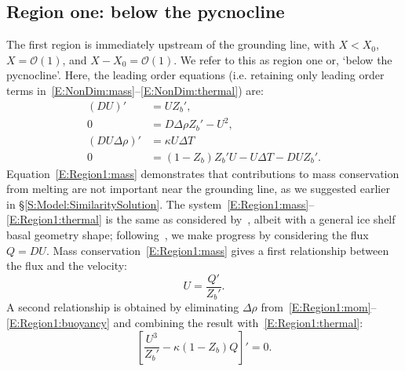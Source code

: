 \documentclass[openacc]{rsproca_new}%
\newcommand{\dd}[2]{\frac{\mathrm{d} #1}{\mathrm{d} #2}}
\newcommand{\order}[1]{\mathcal{O}(#1)}
\begin{document}
\subsection{Region one: below the pycnocline}\label{S:Asymptotics:Region1}
The first region is immediately upstream of the grounding line,  with $X  <  X_0$,  $X= \order{1}$, and $X - X_0 = \mathcal{O}(1)$. We refer to this as region one or, `below the pycnocline'. Here, the leading order equations (i.e. retaining only leading order terms in~\eqref{E:NonDim:mass}--\eqref{E:NonDim:thermal}) are:
\begin{align}
(DU)' &= U Z_b',\label{E:Region1:mass}\\
0 &= D \Delta \rho Z_b' - U^2, \label{E:Region1:mom}\\
(DU\Delta \rho)'  &=\kappa U \Delta T\label{E:Region1:buoyancy}\\
0&= (1  - Z_b)Z_b' U- U\Delta T - DU Z_b'.\label{E:Region1:thermal}
\end{align}
Equation~\eqref{E:Region1:mass} demonstrates that contributions to mass conservation from melting are not important near the grounding line, as we suggested earlier in \S\ref{S:Model:SimilaritySolution}. 
The system~\eqref{E:Region1:mass}--\eqref{E:Region1:thermal} is the same as considered by~\cite{Lazeroms2019JPhysOcean}, albeit with a general ice shelf basal geometry shape; following~\cite{Lazeroms2019JPhysOcean}, we make progress by considering the flux $Q= DU$. Mass conservation~\eqref{E:Region1:mass} gives a first relationship between the flux and the velocity:
\begin{equation}\label{E:Region1:U_Q_relation1}
U = \frac{Q'}{Z_b'}.
\end{equation}
A second relationship is obtained by eliminating $\Delta \rho$ from~\eqref{E:Region1:mom}--\eqref{E:Region1:buoyancy} and combining the result with~\eqref{E:Region1:thermal}:
\begin{equation}\label{E:Region1:U_Q_relation2}
\left[\frac{U^3}{Z_b'} - \kappa (1 - Z_b)Q\right]' = 0.
\end{equation}
\end{document}

